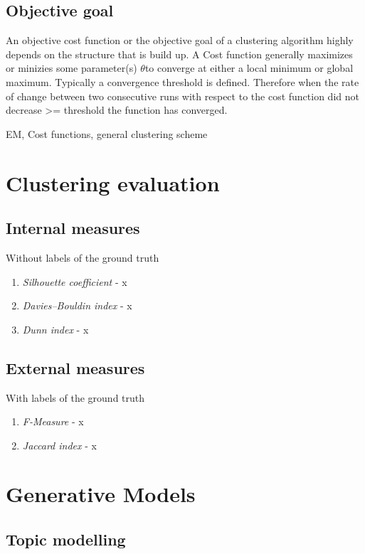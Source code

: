   \subsection{Objective goal}
    An objective cost function or the objective goal of a clustering algorithm highly depends on the structure that is build up. A Cost function generally maximizes or minizies some parameter(s) $\theta$to converge at either a local minimum or global maximum. Typically a convergence threshold is defined. Therefore when the rate of change between two consecutive runs with respect to the cost function did not decrease >= threshold the function has converged.

    EM, Cost functions, general clustering scheme

\section{Clustering evaluation}

  \subsection{Internal measures}
    Without labels of the ground truth

    \begin{enumerate}
      \item \emph{Silhouette coefficient} - x
      \item \emph{Davies–Bouldin index} - x
      \item \emph{Dunn index} - x
    \end{enumerate}

  \subsection{External measures}
    With labels of the ground truth

    \begin{enumerate}
      \item \emph{F-Measure} - x
      \item \emph{Jaccard index} - x
    \end{enumerate}

\section{Generative Models}    
  
  \subsection{Topic modelling}
